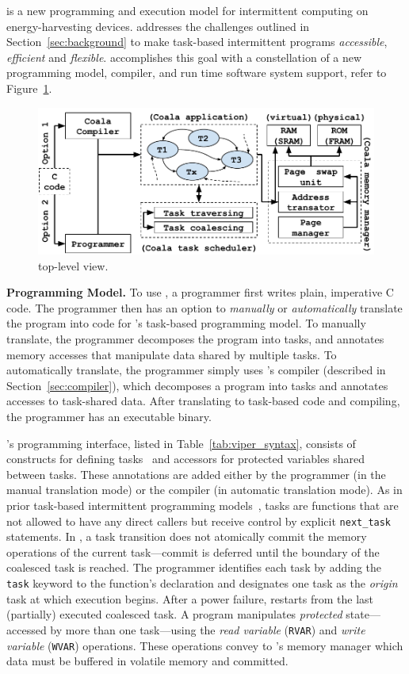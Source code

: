 \sys is a new programming and execution model for intermittent computing on energy-harvesting devices. \sys addresses the challenges outlined in Section~\ref{sec:background} to make task-based intermittent programs {\em accessible}, {\em efficient} and {\em flexible}. \sys accomplishes this goal with a constellation of a new programming model, compiler, and run time software system support, refer to Figure~\ref{fig:system_overview}.

\begin{figure}
	\centering
	\includegraphics[width=\columnwidth]{figures/viper_block_diagram.pdf}
	\caption{\sys top-level view.}
	\label{fig:system_overview}
\end{figure}

\textbf{\sys Programming Model.} To use \sys, a programmer first writes plain, imperative C code. The programmer then has an option to {\em manually} or {\em automatically} translate the program into code for \sys's task-based programming model. To manually translate, the programmer decomposes the program into tasks, and annotates memory accesses that manipulate data shared by multiple tasks. To automatically translate, the programmer simply uses \sys's compiler (described in Section~\ref{sec:compiler}), which decomposes a program into tasks and annotates accesses to task-shared data. After translating to task-based code and compiling, the programmer has an executable \sys binary.

\sys's programming interface, listed in Table~\ref{tab:viper_syntax}, consists of
constructs for defining tasks~\cite{chain,alpaca} and accessors for
protected variables shared between tasks. These annotations are added either by
the programmer (in the manual translation mode) or the compiler (in automatic
translation mode). As in prior task-based intermittent programming
models~\cite{chain,alpaca}, tasks are functions that are not allowed to have
any direct callers but receive control by explicit {\tt next\_task} statements.
In \sys, a task transition does not atomically commit the memory operations of the current task---commit is deferred until the boundary of the coalesced task is reached. The programmer identifies each task by adding the {\tt task}
keyword to the function's declaration and designates one task as the {\em
origin} task at which execution begins. After a power failure,
\sys restarts from the last (partially) executed coalesced task.
%
A \sys program manipulates {\em protected} state---accessed by more than one
task---using the \emph{read variable} ({\tt RVAR}) and \emph{write variable}
({\tt WVAR}) operations. These operations convey to \sys's memory manager which
data must be buffered in volatile memory and committed.

